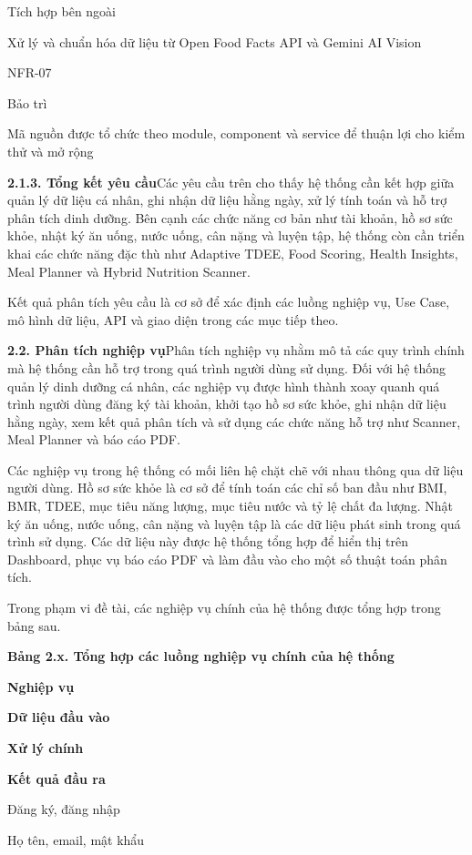 Tích hợp bên ngoài

Xử lý và chuẩn hóa dữ liệu từ Open Food Facts API và Gemini AI Vision

NFR-07

Bảo trì

Mã nguồn được tổ chức theo module, component và service để thuận lợi cho kiểm thử và mở rộng

\textbf{2.1.3. Tổng kết yêu cầu}Các yêu cầu trên cho thấy hệ thống cần kết hợp giữa quản lý dữ liệu cá nhân, ghi nhận dữ liệu hằng ngày, xử lý tính toán và hỗ trợ phân tích dinh dưỡng. Bên cạnh các chức năng cơ bản như tài khoản, hồ sơ sức khỏe, nhật ký ăn uống, nước uống, cân nặng và luyện tập, hệ thống còn cần triển khai các chức năng đặc thù như Adaptive TDEE, Food Scoring, Health Insights, Meal Planner và Hybrid Nutrition Scanner.

Kết quả phân tích yêu cầu là cơ sở để xác định các luồng nghiệp vụ, Use Case, mô hình dữ liệu, API và giao diện trong các mục tiếp theo.

\textbf{2.2. Phân tích nghiệp vụ}Phân tích nghiệp vụ nhằm mô tả các quy trình chính mà hệ thống cần hỗ trợ trong quá trình người dùng sử dụng. Đối với hệ thống quản lý dinh dưỡng cá nhân, các nghiệp vụ được hình thành xoay quanh quá trình người dùng đăng ký tài khoản, khởi tạo hồ sơ sức khỏe, ghi nhận dữ liệu hằng ngày, xem kết quả phân tích và sử dụng các chức năng hỗ trợ như Scanner, Meal Planner và báo cáo PDF.

Các nghiệp vụ trong hệ thống có mối liên hệ chặt chẽ với nhau thông qua dữ liệu người dùng. Hồ sơ sức khỏe là cơ sở để tính toán các chỉ số ban đầu như BMI, BMR, TDEE, mục tiêu năng lượng, mục tiêu nước và tỷ lệ chất đa lượng. Nhật ký ăn uống, nước uống, cân nặng và luyện tập là các dữ liệu phát sinh trong quá trình sử dụng. Các dữ liệu này được hệ thống tổng hợp để hiển thị trên Dashboard, phục vụ báo cáo PDF và làm đầu vào cho một số thuật toán phân tích.

Trong phạm vi đề tài, các nghiệp vụ chính của hệ thống được tổng hợp trong bảng sau.

\textbf{Bảng 2.x. Tổng hợp các luồng nghiệp vụ chính của hệ thống}

\textbf{Nghiệp vụ}

\textbf{Dữ liệu đầu vào}

\textbf{Xử lý chính}

\textbf{Kết quả đầu ra}

Đăng ký, đăng nhập

Họ tên, email, mật khẩu

